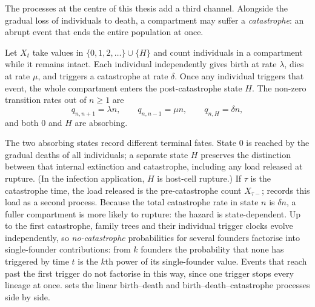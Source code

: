 The processes at the centre of this thesis add a third channel. Alongside the
gradual loss of individuals to death, a compartment may suffer a
\emph{catastrophe}: an abrupt event that ends the entire population at once.

\begin{definition}
\label{m:def:bdc}
Let $X_t$ take values in $\{0,1,2,\ldots\}\cup\{H\}$ and count individuals in a
compartment while it remains intact. Each individual independently gives birth at
rate $\lambda$, dies at rate $\mu$, and triggers a catastrophe at rate $\delta$.
Once any individual triggers that event, the whole compartment enters the
post-catastrophe state $H$. The non-zero transition rates out of $n\ge1$ are
\begin{equation}
\label{m:eq:bdcrates}
q_{n,n+1} = \lambda n,
\qquad
q_{n,n-1} = \mu n,
\qquad
q_{n,H} = \delta n ,
\end{equation}
and both $0$ and $H$ are absorbing.
\end{definition}

The two absorbing states record different terminal fates. State $0$ is reached by
the gradual deaths of all individuals; a separate state $H$ preserves the
distinction between that internal extinction and catastrophe, including any load
released at rupture. (In the infection application, $H$ is host-cell rupture.)
If $\tau$ is the catastrophe time, the load released is the pre-catastrophe count
$X_{\tau-}$; 
records this load as a second process. Because the
total catastrophe rate in state $n$ is $\delta n$, a fuller compartment is more
likely to rupture: the hazard is state-dependent. Up to the first catastrophe,
family trees and their individual trigger clocks evolve independently, so
\emph{no-catastrophe} probabilities for several founders factorise into
single-founder contributions: from $k$ founders the probability that none has
triggered by time $t$ is the $k$th power of its single-founder value. Events
that reach past the first trigger do not factorise in this way, since one
trigger stops every lineage at once.
 sets the linear birth--death and
birth--death--catastrophe processes side by side.

